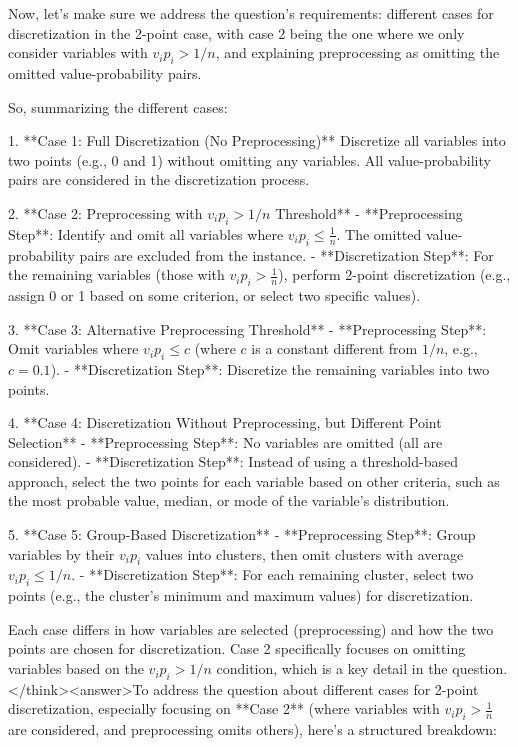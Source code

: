 Now, let's make sure we address the question's requirements: different cases for discretization in the 2-point case, with case 2 being the one where we only consider variables with \( v_i p_i > 1/n \), and explaining preprocessing as omitting the omitted value-probability pairs.

So, summarizing the different cases:

1. **Case 1: Full Discretization (No Preprocessing)**  
   Discretize all variables into two points (e.g., 0 and 1) without omitting any variables. All value-probability pairs are considered in the discretization process.

2. **Case 2: Preprocessing with \( v_i p_i > 1/n \) Threshold**  
   - **Preprocessing Step**: Identify and omit all variables where \( v_i p_i \leq \frac{1}{n} \). The omitted value-probability pairs are excluded from the instance.  
   - **Discretization Step**: For the remaining variables (those with \( v_i p_i > \frac{1}{n} \)), perform 2-point discretization (e.g., assign 0 or 1 based on some criterion, or select two specific values).  

3. **Case 3: Alternative Preprocessing Threshold**  
   - **Preprocessing Step**: Omit variables where \( v_i p_i \leq c \) (where \( c \) is a constant different from \( 1/n \), e.g., \( c = 0.1 \)).  
   - **Discretization Step**: Discretize the remaining variables into two points.  

4. **Case 4: Discretization Without Preprocessing, but Different Point Selection**  
   - **Preprocessing Step**: No variables are omitted (all are considered).  
   - **Discretization Step**: Instead of using a threshold-based approach, select the two points for each variable based on other criteria, such as the most probable value, median, or mode of the variable's distribution.  

5. **Case 5: Group-Based Discretization**  
   - **Preprocessing Step**: Group variables by their \( v_i p_i \) values into clusters, then omit clusters with average \( v_i p_i \leq 1/n \).  
   - **Discretization Step**: For each remaining cluster, select two points (e.g., the cluster's minimum and maximum values) for discretization.  

Each case differs in how variables are selected (preprocessing) and how the two points are chosen for discretization. Case 2 specifically focuses on omitting variables based on the \( v_i p_i > 1/n \) condition, which is a key detail in the question.</think><answer>To address the question about different cases for 2-point discretization, especially focusing on **Case 2** (where variables with \( v_i p_i > \frac{1}{n} \) are considered, and preprocessing omits others), here’s a structured breakdown:  


